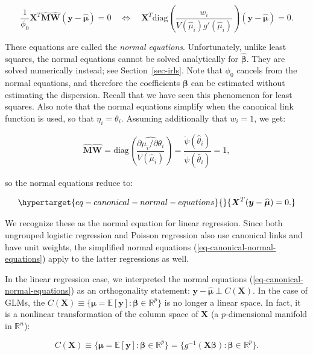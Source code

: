 \documentclass[
  11pt,
  letterpaper,
  oneside]{book}
\theoremstyle{plain}
\theoremstyle{plain}
\theoremstyle{definition}
\theoremstyle{definition}
\theoremstyle{plain}
\theoremstyle{remark}
\begin{document}
\[
\frac{1}{\phi_0}\boldsymbol{X}^T \widehat{\boldsymbol{M}} \widehat{\boldsymbol{W}} (\boldsymbol{y} - \widehat{\boldsymbol{\mu}}) = 0 \quad \Longleftrightarrow \quad \boldsymbol{X}^T \text{diag}\left(\frac{w_i}{V(\widehat \mu_i)g'(\widehat \mu_i)}\right)(\boldsymbol{y} - \widehat{\boldsymbol{\mu}}) = 0.
\]

These equations are called the \emph{normal equations}. Unfortunately,
unlike least squares, the normal equations cannot be solved analytically
for \(\widehat{\boldsymbol{\beta}}\). They are solved numerically
instead; see Section~\ref{sec-irls}. Note that \(\phi_0\) cancels from
the normal equations, and therefore the coefficients
\(\boldsymbol{\beta}\) can be estimated without estimating the
dispersion. Recall that we have seen this phenomenon for least squares.
Also note that the normal equations simplify when the canonical link
function is used, so that \(\eta_i = \theta_i\). Assuming additionally
that \(w_i = 1\), we get:

\[
\boldsymbol{\widehat M} \boldsymbol{\widehat W} = \text{diag}\left(\frac{\widehat{\partial \mu_i/\partial \theta_i}}{V(\widehat \mu_i)}\right) = \frac{\ddot{\psi}(\widehat \theta_i)}{\ddot{\psi}(\widehat \theta_i)} = 1,
\]

so the normal equations reduce to:

\begin{equation}\protect\hypertarget{eq-canonical-normal-equations}{}{
\boldsymbol{X}^T (\boldsymbol{y} - \widehat{\boldsymbol{\mu}}) = 0.
}\label{eq-canonical-normal-equations}\end{equation}

We recognize these as the normal equation for linear regression. Since
both ungrouped logistic regression and Poisson regression also use
canonical links and have unit weights, the simplified normal equations
(\ref{eq-canonical-normal-equations}) apply to the latter regressions as
well.

In the linear regression case, we interpreted the normal equations
(\ref{eq-canonical-normal-equations}) as an orthogonality statement:
\(\boldsymbol{y} - \widehat{\boldsymbol{\mu}} \perp C(\boldsymbol{X})\).
In the case of GLMs, the
\(C(\boldsymbol{X}) \equiv \{\boldsymbol{\mu} = \mathbb{E}[\boldsymbol{y}]: \boldsymbol{\beta} \in \mathbb{R}^p\}\)
is no longer a linear space. In fact, it is a nonlinear transformation
of the column space of \(\boldsymbol{X}\) (a \(p\)-dimensional manifold
in \(\mathbb{R}^n\)):

\[
C(\boldsymbol{X}) \equiv \{\boldsymbol{\mu} = \mathbb{E}[\boldsymbol{y}]: \boldsymbol{\beta} \in \mathbb{R}^p\} = \{g^{-1}(\boldsymbol{X} \boldsymbol{\beta}): \boldsymbol{\beta} \in \mathbb{R}^p\}.
\]
\end{document}
